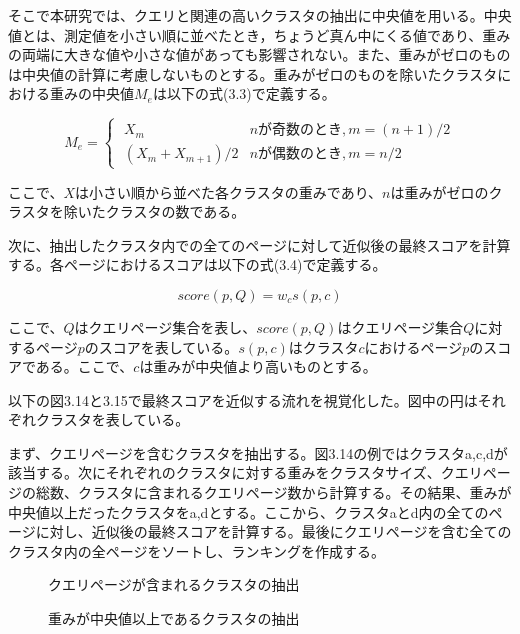 \documentclass[a4paper,11pt]{jreport}
\begin{document}
そこで本研究では、クエリと関連の高いクラスタの抽出に中央値を用いる。中央値とは、測定値を小さい順に並べたとき，ちょうど真ん中にくる値であり、重みの両端に大きな値や小さな値があっても影響されない。また、重みがゼロのものは中央値の計算に考慮しないものとする。重みがゼロのものを除いたクラスタにおける重みの中央値$M_e$は以下の式(3.3)で定義する。

\begin{equation}
M_e =
\begin{cases}
\; X_m & nが奇数のとき,m = (n+1) / 2 \\
\; (X_m + X_{m+1})/2 & nが偶数のとき,m = n/2
\end{cases}
\end{equation}

ここで、$X$は小さい順から並べた各クラスタの重みであり、$n$は重みがゼロのクラスタを除いたクラスタの数である。

次に、抽出したクラスタ内での全てのページに対して近似後の最終スコアを計算する。各ページにおけるスコアは以下の式(3.4)で定義する。

\begin{equation}
score(p,Q) = w_cs(p,c)
\end{equation}

ここで、$Q$はクエリページ集合を表し、$score(p,Q)$はクエリページ集合$Q$に対するページ$p$のスコアを表している。$s(p,c)$はクラスタ$c$におけるページ$p$のスコアである。ここで、$c$は重みが中央値より高いものとする。

以下の図3.14と3.15で最終スコアを近似する流れを視覚化した。図中の円はそれぞれクラスタを表している。

まず、クエリページを含むクラスタを抽出する。図3.14の例ではクラスタa,c,dが該当する。次にそれぞれのクラスタに対する重みをクラスタサイズ、クエリページの総数、クラスタに含まれるクエリページ数から計算する。その結果、重みが中央値以上だったクラスタをa,dとする。ここから、クラスタaとd内の全てのページに対し、近似後の最終スコアを計算する。最後にクエリページを含む全てのクラスタ内の全ページをソートし、ランキングを作成する。

\begin{figure}[htbp]
\begin{center}
\end{center}
\caption{クエリページが含まれるクラスタの抽出}
\label{figure:sample}
\end{figure}

\begin{figure}[htbp]
\begin{center}
\end{center}
\caption{重みが中央値以上であるクラスタの抽出}
\label{figure:sample}
\end{figure}
\end{document}
